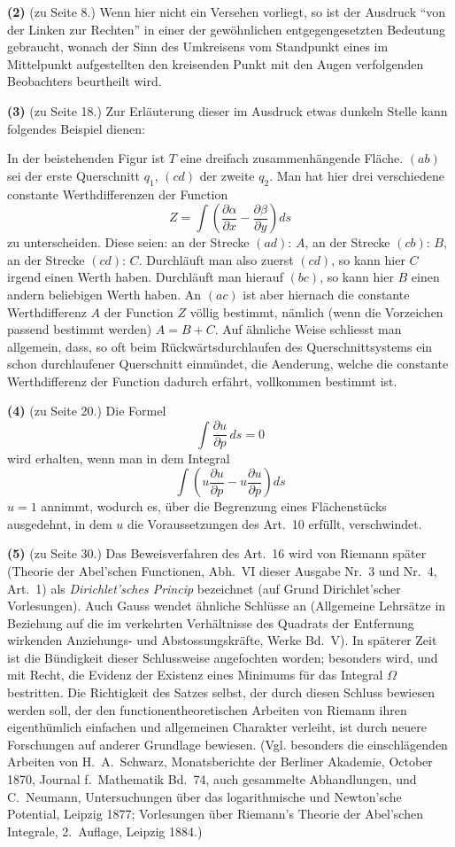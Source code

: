 \documentclass[12pt,a4paper]{article}
\begin{document}
\textbf{(2)} (zu Seite 8.) Wenn hier nicht ein Versehen vorliegt, so ist der Ausdruck ``von der Linken zur Rechten'' in einer der gewöhnlichen entgegengesetzten Bedeutung gebraucht, wonach der Sinn des Umkreisens vom Standpunkt eines im Mittelpunkt aufgestellten den kreisenden Punkt mit den Augen verfolgenden Beobachters beurtheilt wird.

\textbf{(3)} (zu Seite 18.) Zur Erläuterung dieser im Ausdruck etwas dunkeln Stelle kann folgendes Beispiel dienen:

In der beistehenden Figur ist $T$ eine dreifach zusammenhängende Fläche. $(ab)$ sei der erste Querschnitt $q_1$, $(cd)$ der zweite $q_2$. Man hat hier drei verschiedene constante Werthdifferenzen der Function
\[
Z = \int \left(\frac{\partial \alpha}{\partial x} - \frac{\partial \beta}{\partial y}\right) ds
\]
zu unterscheiden. Diese seien: an der Strecke $(ad)$: $A$, an der Strecke $(cb)$: $B$, an der Strecke $(cd)$: $C$. Durchläuft man also zuerst $(cd)$, so kann hier $C$ irgend einen Werth haben. Durchläuft man hierauf $(bc)$, so kann hier $B$ einen andern beliebigen Werth haben. An $(ac)$ ist aber hiernach die constante Werthdifferenz $A$ der Function $Z$ völlig bestimmt, nämlich (wenn die Vorzeichen passend bestimmt werden) $A = B + C$. Auf ähnliche Weise schliesst man allgemein, dass, so oft beim Rückwärtsdurchlaufen des Querschnittsystems ein schon durchlaufener Querschnitt einmündet, die Aenderung, welche die constante Werthdifferenz der Function dadurch erfährt, vollkommen bestimmt ist.

\textbf{(4)} (zu Seite 20.) Die Formel
\[
\int \frac{\partial u}{\partial p}\, ds = 0
\]
wird erhalten, wenn man in dem Integral
\[
\int \left( u \frac{\partial u}{\partial p} - u \frac{\partial u}{\partial p} \right) ds
\]
$u = 1$ annimmt, wodurch es, über die Begrenzung eines Flächenstücks ausgedehnt, in dem $u$ die Voraussetzungen des Art.~10 erfüllt, verschwindet.

\textbf{(5)} (zu Seite 30.) Das Beweisverfahren des Art.~16 wird von Riemann später (Theorie der Abel'schen Functionen, Abh.~VI dieser Ausgabe Nr.~3 und Nr.~4, Art.~1) als \textit{Dirichlet'sches Princip} bezeichnet (auf Grund Dirichlet'scher Vorlesungen). Auch Gauss wendet ähnliche Schlüsse an (Allgemeine Lehrsätze in Beziehung auf die im verkehrten Verhältnisse des Quadrats der Entfernung wirkenden Anziehungs- und Abstossungskräfte, Werke Bd.~V). In späterer Zeit ist die Bündigkeit dieser Schlussweise angefochten worden; besonders wird, und mit Recht, die Evidenz der Existenz eines Minimums für das Integral $\Omega$ bestritten. Die Richtigkeit des Satzes selbst, der durch diesen Schluss bewiesen werden soll, der den functionentheoretischen Arbeiten von Riemann ihren eigenthümlich einfachen und allgemeinen Charakter verleiht, ist durch neuere Forschungen auf anderer Grundlage bewiesen. (Vgl. besonders die einschlägenden Arbeiten von H.~A.~Schwarz, Monatsberichte der Berliner Akademie, October 1870, Journal f.~Mathematik Bd.~74, auch gesammelte Abhandlungen, und C.~Neumann, Untersuchungen über das logarithmische und Newton'sche Potential, Leipzig 1877; Vorlesungen über Riemann's Theorie der Abel'schen Integrale, 2.~Auflage, Leipzig 1884.)
\end{document}
